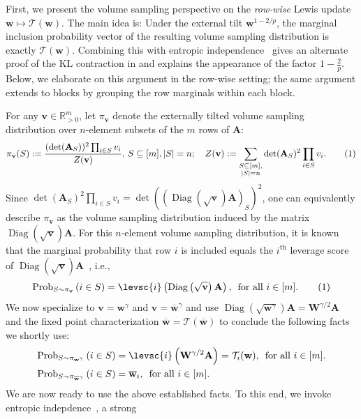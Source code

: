 \documentclass[11pt]{article}
\newcommand\numberthis{\addtocounter{equation}{1}\tag{\theequation}}
\theoremstyle{plain}
\numberwithin{equation}{section}
\newcommand{\Diag}{\operatorname{Diag}}
\newcommand{\Rmspos}{\mathbb{R}^m_{>0}}
\newcommand{\Prob}{\operatorname{Prob}}
\newcommand{\bA}{\mathbf{A}}
\newcommand{\bW}{\mathbf{W}}
\newcommand{\bw}{\mathbf{w}}
\newcommand{\bv}{\mathbf{v}}
\newcommand{\bwbar}{\overline{\mathbf{w}}}
\newcommand{\calT}{\mathcal{T}}
\newcommand{\omrp}{\gamma}
\begin{document}
First, we present the volume sampling perspective on the \emph{row-wise} Lewis update $\bw\mapsto\calT(\bw)$. The main idea is: 
Under the external tilt $\bw^{1-2/p}$, the marginal inclusion probability vector of the resulting volume sampling distribution is exactly $\calT(\bw)$. 
Combining this with entropic independence~\cite{anari2022entropic} gives an alternate proof of the KL contraction in  and explains the appearance of the factor $1-\frac{2}{p}$.
Below, we elaborate on this argument in the row-wise setting; the same argument extends to blocks by grouping the row marginals within each block.

  For any $\bv\in\Rmspos$, let $\pi_{\bv}$ denote the externally tilted volume sampling distribution 
  over $n$-element subsets of the $m$ rows of $\bA$:
  \[\pi_{\bv}(S) := \frac{(\det(\bA_S))^2\prod_{i \in S} v_i}{Z(\bv)},\, S\subseteq[m], |S| = n; \quad Z(\bv) := \sum_{\substack{S\subseteq[m],\\|S|=n}} \det(\bA_S)^2\prod_{i\in S}v_i.\numberthis\label{eq:EI-con-0}\] 
Since $\det(\bA_S)^2\prod_{i\in S}v_i = \det\left(\left(\Diag(\sqrt{\bv})\bA\right)_S\right)^2$, one can equivalently describe $\pi_{\bv}$ as the volume sampling distribution induced by the matrix $\Diag(\sqrt{\bv})\bA$. For this $n$-element volume sampling distribution, it is known that the marginal probability that row $i$ is included equals the $i^\mathrm{th}$ leverage score of $\Diag(\sqrt{\bv})\bA$~\cite[Proposition 4]{derezinski2018reverse}\cite[Theorem 8]{derezinski2021determinantal}, i.e., \[ \Prob_{S\sim \pi_{\bv}}\left(i\in S\right) = \levsc{i}\left(\Diag\left(\sqrt{\bv}\right)\bA\right), \, \text{ for all } i\in[m]. \numberthis\label{eq:EI-con-01}\] We now specialize  to $\bv=\bw^{\omrp}$ and $\bv=\bwbar^\omrp$ and use $\Diag\left(\sqrt{\bw^\omrp}\right)\bA = \bW^{\omrp/2}\bA$ and the fixed point characterization $\bwbar=\calT(\bwbar)$  to conclude the following facts we shortly use: \begin{equation}\begin{aligned}\Prob_{S \sim \pi_{\bw^\omrp}}\left(i\in S\right) &= \levsc{i}\left(\bW^{\omrp/2}\bA\right) = \calT_i(\bw), \, \text{ for all } i\in[m]. \\
\Prob_{S\sim\pi_{\bwbar^\omrp}}\left(i\in S\right) &= \bwbar_i, \, \text{ for all } i\in[m]. \label{eq:EI-con-02}\end{aligned}\end{equation} 
We are now ready to use the above established facts. 
To this end, we invoke entropic indepdence~\cite{anari2022entropic}, a strong
\end{document}
